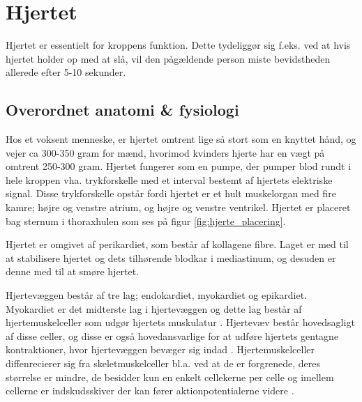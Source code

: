 \section{Hjertet}\label{Hjerte}


Hjertet er essentielt for kroppens funktion. Dette tydeliggør sig f.eks. ved at hvis hjertet holder op med at slå, vil den pågældende person miste bevidstheden allerede efter 5-10 sekunder. 

\subsection{Overordnet anatomi \& fysiologi}\label{Hjerte_ana_fys}

Hos et voksent menneske, er hjertet omtrent lige så stort som en knyttet hånd, og vejer ca 300-350 gram for mænd, hvorimod kvinders hjerte har en vægt på omtrent 250-300 gram.
Hjertet fungerer som en pumpe, der pumper blod rundt i hele kroppen vha. trykforskelle med et interval bestemt af hjertets elektriske signal. Disse trykforskelle opstår fordi hjertet er et hult muskelorgan med fire kamre; højre og venstre atrium, og højre og venstre ventrikel. Hjertet er placeret bag sternum i thoraxhulen som ses på figur \ref{fig:hjerte_placering}. %


Hjertet er omgivet af perikardiet, som består af kollagene fibre. Laget er med til at stabilisere hjertet og dets tilhørende blodkar i mediastinum, og desuden er denne med til at smøre hjertet.

Hjertevæggen består af tre lag; endokardiet, myokardiet og epikardiet. Myokardiet er det midterste lag i hjertevæggen og dette lag består af hjertemuskelceller som udgør hjertets muskulatur \cite{gronanatomi}. Hjertevæv består hovedsagligt af disse celler, og disse er også hovedansvarlige for at udføre hjertets gentagne kontraktioner, hvor hjertevæggen bevæger sig indad \cite{cindy}. 
Hjertemuskelceller diffenrecierer sig fra skeletmuskelceller bl.a. ved at de er forgrenede, deres størrelse er mindre, de besidder kun en enkelt cellekerne per celle og imellem cellerne er indskudsskiver der kan fører aktionpotentialerne videre \cite{martini}.


